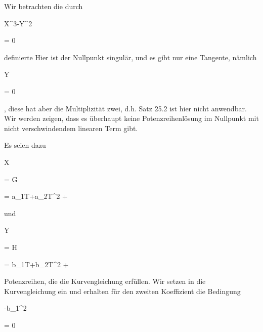
{


Wir betrachten die durch


\mavergleichskette

{\vergleichskette

{X^3-Y^2
}

{ = }{ 0
}

{  }{
}

{    }{
}

{   }{
}

}
{}{}{}
definierte
Hier ist der Nullpunkt singulär, und es gibt nur eine Tangente, nämlich


\mavergleichskette

{\vergleichskette

{Y
}

{ = }{ 0
}

{  }{
}

{    }{
}

{   }{
}

}
{}{}{,}
diese hat aber die Multiplizität zwei, d.h.
Satz 25.2
ist hier nicht anwendbar. Wir werden zeigen, dass es überhaupt keine Potenzreihenlösung im Nullpunkt mit nicht verschwindendem linearen Term gibt.


Es seien dazu


\mavergleichskette

{\vergleichskette

{X
}

{ = }{ G
}

{ = }{ a_1T+a_2T^2 + \cdots
}

{    }{
}

{   }{
}

}
{}{}{}
und


\mavergleichskette

{\vergleichskette

{Y
}

{ = }{ H
}

{ = }{ b_1T+b_2T^2 + \cdots
}

{    }{
}

{   }{
}

}
{}{}{}
Potenzreihen, die die Kurvengleichung erfüllen. Wir setzen in die Kurvengleichung ein und erhalten für den zweiten Koeffizient die Bedingung


\mavergleichskette

{\vergleichskette

{ -b_1^2
}

{ = }{ 0
}

}}
